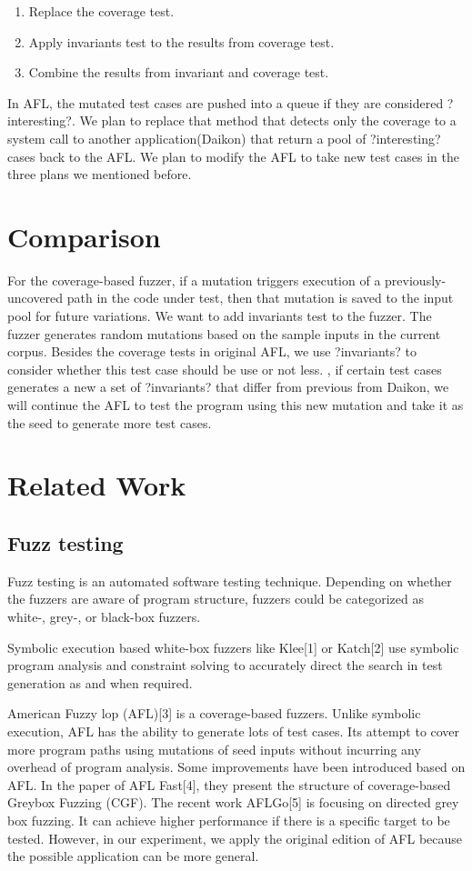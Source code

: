 \documentclass[sigplan,10pt,review]{acmart}\settopmatter{printfolios=true,printccs=false,printacmref=false}
\begin{document}
\begin{enumerate}
\item Replace the coverage test.
\item Apply invariants test to the results from coverage test.
\item Combine the results from invariant and coverage test.
\end{enumerate}

In AFL, the mutated test cases are pushed into a queue if they are considered ?interesting?. We plan to replace that method that detects only the coverage to a system call to another application(Daikon) that return a pool of ?interesting? cases back to the AFL. We plan to modify the AFL to take new test cases in the three plans we mentioned before.

\section{Comparison}
For the coverage-based fuzzer, if a mutation triggers execution of a previously-uncovered path in the code under test, then that mutation is saved to the input pool for future variations. We want to add invariants test to the fuzzer. The fuzzer generates random mutations based on the sample inputs in the current corpus. Besides the coverage tests in original AFL, we use ?invariants? to consider whether this test case should be use or not less. , if certain test cases generates a new a set of ?invariants? that differ from previous from Daikon, we will continue the AFL to test the program using this new mutation and take it as the seed to generate more test cases.

\section{Related Work}
\subsection{Fuzz testing}
Fuzz testing is an automated software testing technique. Depending on whether the fuzzers are aware of program structure, fuzzers could be categorized as white-, grey-, or black-box fuzzers.

Symbolic execution based white-box fuzzers like Klee[1] or Katch[2] use symbolic program analysis and constraint solving to accurately direct the search in test generation as and when required.

American Fuzzy lop (AFL)[3] is a coverage-based fuzzers. Unlike symbolic execution, AFL has the ability to generate lots of test cases. Its attempt to cover more program paths using mutations of seed inputs without incurring any overhead of program analysis. Some improvements have been introduced based on AFL. In the paper of AFL Fast[4], they present the structure of coverage-based Greybox Fuzzing (CGF). The recent work AFLGo[5] is focusing on directed grey box fuzzing. It can achieve higher performance if there is a specific target to be tested. However, in our experiment, we apply the original edition of AFL because the possible application can be more general.
\end{document}
